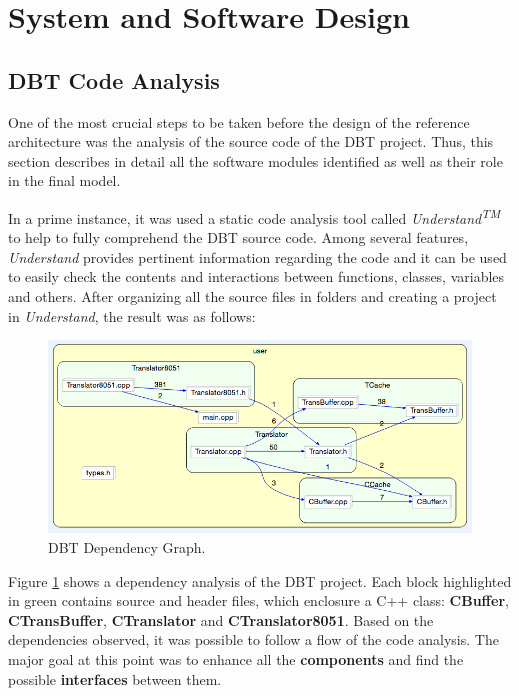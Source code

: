 \documentclass[12pt]{article}
\begin{document}
{%
\newpage
\section{System and Software Design}

\subsection {DBT Code Analysis}
One of the most crucial steps to be taken before the design of the reference architecture was the analysis of the source code of the DBT project. Thus, this section describes in detail all the software modules identified as well as their role in the final model. 

In a prime instance, it was used a static code analysis tool called \textit{Understand\textsuperscript{TM}} to help to fully comprehend the DBT source code. Among several features, \textit{Understand} provides pertinent information regarding the code and it can be used to easily check the contents and interactions between functions, classes, variables and others. After organizing all the source files in folders and creating a project in \textit{Understand}, the result was as follows:        
 
\begin{figure}[!hb]
\centerline{
\includegraphics[scale=0.55]{images/understand}}
\caption{DBT Dependency Graph.}
\label{fig:understand} 
\end{figure}

Figure \ref{fig:understand} shows a dependency analysis of the DBT project. Each block highlighted in green contains source and header files, which enclosure a C++ class: \textbf{CBuffer}, \textbf{CTransBuffer}, \textbf{CTranslator} and \textbf{CTranslator8051}. Based on the dependencies observed, it was possible to follow a flow of the code analysis. The major goal at this point was to enhance all the \textbf{components} and find the possible \textbf{interfaces} between them.

}
\end{document}
